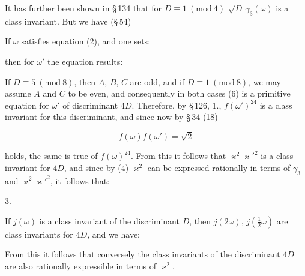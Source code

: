 
It has further been shown in \S\,134 that for $D\equiv 1\ (\mathrm{mod}\ 4)$
$\sqrt{D}\,\gamma_3(\omega)$ is a class invariant. But we have (\S\,54)


If $\omega$ satisfies equation (2), and one sets:


then for $\omega'$ the equation results:


If $D\equiv 5\ (\mathrm{mod}\ 8)$, then $A$, $B$, $C$ are odd, and if
$D\equiv 1\ (\mathrm{mod}\ 8)$, we may assume $A$ and $C$ to be even, and
consequently in both cases (6) is a primitive equation for $\omega'$
of discriminant $4D$. Therefore, by \S\,126, 1., $f(\omega')^{24}$ is
a class invariant for this discriminant, and since now
by \S\,34 (18)

\[ f(\omega)f(\omega') = \sqrt{2} \]

holds, the same is true of $f(\omega)^{24}$. From this it follows that $\varkappa^2\varkappa'^2$
is a class invariant for $4D$, and since by (4) $\varkappa^2$ can be expressed rationally
in terms of $\gamma_3$ and $\varkappa^2\varkappa'^2$, it follows that:

3. 

If $j(\omega)$ is a class invariant of the discriminant $D$, then
$j(2\omega)$, $j(\frac{1}{2}\omega)$ are class invariants for $4D$, and we have:


From this it follows that conversely the class invariants
of the discriminant $4D$ are also rationally expressible in terms of $\varkappa^2$.
